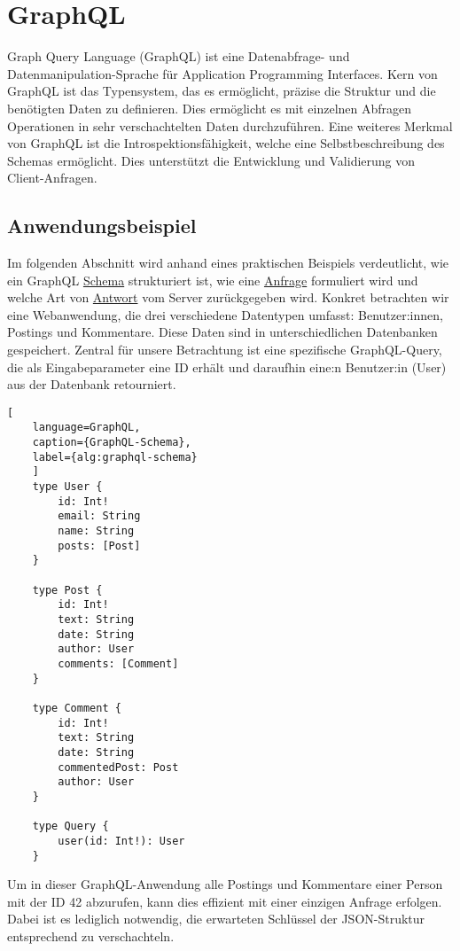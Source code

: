 \documentclass[draft,final]{vutinfth} %
\begin{document}
\section{GraphQL}

Graph Query Language (GraphQL) ist eine Datenabfrage- und Datenmanipulation-Sprache für Application Programming Interfaces. 
Kern von GraphQL ist das Typensystem, das es ermöglicht, präzise die Struktur und die benötigten Daten zu definieren. Dies ermöglicht es mit einzelnen Abfragen Operationen in sehr verschachtelten Daten durchzuführen.
Eine weiteres Merkmal von GraphQL ist die Introspektionsfähigkeit, welche eine Selbstbeschreibung des Schemas ermöglicht.
Dies unterstützt die Entwicklung und Validierung von Client-Anfragen.


\subsection{Anwendungsbeispiel}

Im folgenden Abschnitt wird anhand eines praktischen Beispiels verdeutlicht, wie ein GraphQL  \hyperref[alg:graphql-schema]{Schema} strukturiert ist, wie eine \hyperref[alg:graphql-request]{Anfrage} formuliert wird und welche Art von \hyperref[alg:graphql-response]{Antwort} vom Server zurückgegeben wird. 
Konkret betrachten wir eine Webanwendung, die drei verschiedene Datentypen umfasst: Benutzer:innen, Postings und Kommentare. 
Diese Daten sind in unterschiedlichen Datenbanken gespeichert. 
Zentral für unsere Betrachtung ist eine spezifische GraphQL-Query, die als Eingabeparameter eine ID erhält und daraufhin eine:n Benutzer:in (User) aus der Datenbank retourniert.

\begin{lstlisting}[
	language=GraphQL, 
	caption={GraphQL-Schema}, 
	label={alg:graphql-schema}
	]
	type User {
		id: Int!
		email: String
		name: String
		posts: [Post]
	}
	
	type Post {
		id: Int!
		text: String
		date: String
		author: User
		comments: [Comment]
	}
	
	type Comment {
		id: Int!
		text: String
		date: String
		commentedPost: Post
		author: User
	}
	
	type Query {
		user(id: Int!): User
	}
\end{lstlisting}

Um in dieser GraphQL-Anwendung alle Postings und Kommentare einer Person mit der ID 42 abzurufen, kann dies effizient mit einer einzigen Anfrage erfolgen. 
Dabei ist es lediglich notwendig, die erwarteten Schlüssel der JSON-Struktur entsprechend zu verschachteln.
\end{document}
